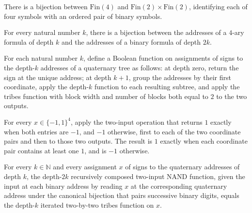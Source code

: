 \begin{definition}
\label{FABL.finFourPairEquiv}
\leanok
There is a bijection between $\mathrm{Fin}(4)$ and
$\mathrm{Fin}(2)\times\mathrm{Fin}(2)$, identifying each of four symbols with an ordered
pair of binary symbols.
\end{definition}

\begin{definition}
\label{FABL.evenFormulaAddressEquiv}
\leanok
{}
For every natural number $k$, there is a bijection between the addresses of a $4$-ary
formula of depth $k$ and the addresses of a binary formula of depth $2k$.
\end{definition}

\begin{definition}
\label{FABL.addressIteratedTribesTwoTwo}
\leanok
{}
For each natural number $k$, define a Boolean function on assignments of signs to the
depth-$k$ addresses of a quaternary tree as follows: at depth zero, return the sign at
the unique address; at depth $k+1$, group the addresses by their first coordinate, apply
the depth-$k$ function to each resulting subtree, and apply the tribes function with
block width and number of blocks both equal to $2$ to the two outputs.
\end{definition}

\begin{theorem}
\label{FABL.nandPair_two_levels_eq_tribes}
\leanok
{}
For every $x\in\{-1,1\}^4$, apply the two-input operation that returns $1$ exactly when
both entries are $-1$, and $-1$ otherwise, first to each of the two coordinate pairs and
then to those two outputs. The result is $1$ exactly when each coordinate pair contains
at least one $1$, and is $-1$ otherwise.
\end{theorem}

\begin{theorem}
\label{FABL.addressRecursiveNAND_even_eq_iteratedTribes}
\leanok
{}
For every $k\in\mathbb{N}$ and every assignment $x$ of signs to the quaternary addresses
of depth $k$, the depth-$2k$ recursively composed two-input NAND function, given the
input at each binary address by reading $x$ at the corresponding quaternary address
under the canonical bijection that pairs successive binary digits, equals the depth-$k$
iterated two-by-two tribes function on $x$.
\end{theorem}

